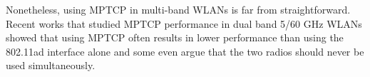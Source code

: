 Nonetheless, using MPTCP in multi-band WLANs
is far from straightforward.
Recent works that studied MPTCP performance in dual band 5/60 GHz
WLANs
showed that using MPTCP often results in lower performance than using
the 802.11ad interface alone and 
some even argue that the two radios should never be used
simultaneously.

